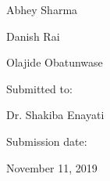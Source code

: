 \documentclass[12pt]{article}
\begin{document}
\begin{Center}
{\fontsize{14pt}{16.8pt}\selectfont Abhey Sharma\par}
\end{Center}\par

\begin{Center}
{\fontsize{14pt}{16.8pt}\selectfont Danish Rai\par}
\end{Center}\par

\begin{Center}
{\fontsize{14pt}{16.8pt}\selectfont Olajide Obatunwase\par}
\end{Center}\par


\vspace{\baselineskip}

\vspace{\baselineskip}

\vspace{\baselineskip}
\begin{Center}
Submitted to:
\end{Center}\par

\begin{Center}
{\fontsize{14pt}{16.8pt}\selectfont Dr. Shakiba Enayati\par}
\end{Center}\par


\vspace{\baselineskip}

\vspace{\baselineskip}

\vspace{\baselineskip}
\begin{Center}
Submission date:
\end{Center}\par

\begin{Center}
{\fontsize{14pt}{16.8pt}\selectfont November 11, 2019\par}
\end{Center}\par


\vspace{\baselineskip}

\vspace{\baselineskip}
\end{document}
